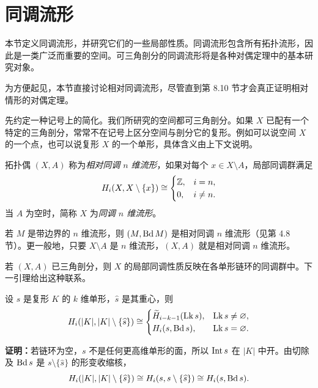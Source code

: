 \section{同调流形}
本节定义同调流形，并研究它们的一些局部性质。同调流形包含所有拓扑流形，因此是一类广泛而重要的空间。可三角剖分的同调流形将是各种对偶定理中的基本研究对象。

为方便起见，本节直接讨论相对同调流形，尽管直到第 8.10 节才会真正证明相对情形的对偶定理。

先约定一种记号上的简化。我们所研究的空间都可三角剖分。如果 $X$ 已配有一个特定的三角剖分，常常不在记号上区分空间与剖分它的复形。例如可以说空间 $X$ 的一个点，也可以说复形 $X$ 的一个单形，具体含义由上下文说明。

拓扑偶 $(X,A)$ 称为\emph{相对同调 $n$ 维流形}，如果对每个 $x\in X\setminus A$，局部同调群满足
\[
H_i(X,X\setminus\{x\})\cong
\begin{cases}\mathbb{Z},&i=n,\\0,&i\ne n.\end{cases}
\]
当 $A$ 为空时，简称 $X$ 为\emph{同调 $n$ 维流形}。

若 $M$ 是带边界的 $n$ 维流形，则 $(M,\operatorname{Bd} M)$ 是相对同调 $n$ 维流形（见第 4.8 节）。更一般地，只要 $X\setminus A$ 是 $n$ 维流形，$(X,A)$ 就是相对同调 $n$ 维流形。

若 $(X,A)$ 已三角剖分，则 $X$ 的局部同调性质反映在各单形链环的同调群中。下一引理给出这种联系。

设 $s$ 是复形 $K$ 的 $k$ 维单形，$\widehat s$ 是其重心，则
\[
H_i(|K|,|K|\setminus\{\widehat s\})\cong
\begin{cases}
\widetilde H_{i-k-1}(\operatorname{Lk}s),&\operatorname{Lk}s\ne\varnothing,\\
H_i(s,\operatorname{Bd} s),&\operatorname{Lk}s=\varnothing.
\end{cases}
\]

\textbf{证明：}若链环为空，$s$ 不是任何更高维单形的面，所以 $\operatorname{Int} s$ 在 $|K|$ 中开。由切除及 $\operatorname{Bd} s$ 是 $s\setminus\{\widehat s\}$ 的形变收缩核，
\[
H_i(|K|,|K|\setminus\{\widehat s\})\cong H_i(s,s\setminus\{\widehat s\})\cong H_i(s,\operatorname{Bd} s).
\]

